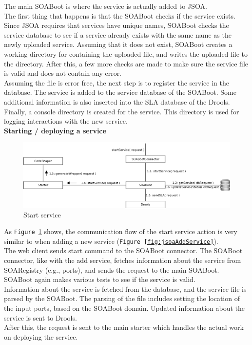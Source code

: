 \documentclass[12pt,a4paper]{article}
\begin{document}
The main SOABoot is where the service is actually added to JSOA. \\
The first thing that happens is that the SOABoot checks if the service exists. Since JSOA requires that services have unique names, SOABoot checks the service database to see if a service already exists with the same name as the newly uploaded service. Assuming that it does not exist, SOABoot creates a working directory for containing the uploaded file, and writes the uploaded file to the directory. After this, a few more checks are made to make sure the service file is valid and does not contain any error. \\
Assuming the file is error free, the next step is to register the service in the database. The service is added to the service database of the SOABoot. Some additional information is also inserted into the SLA database of the Drools. \\
Finally, a console directory is created for the service. This directory is used for logging interactions with the new service. \\

\newpage
\textbf{Starting / deploying a service}
\begin{figure}[h!]
  \centering
    \includegraphics[width=1.0\textwidth]{../figures/jsoa_start_service_communication_diagram.png}
  \caption{Start service}
  \label{fig:jsoaStartService}
\end{figure}

As \texttt{Figure \ref{fig:jsoaStartService}} shows, the communication flow of the start service action is very similar to when adding a new service (\texttt{Figure \ref{fig:jsoaAddService}}). \\
The web client sends start command to the SOABoot connector. The SOABoot connector, like with the add service, fetches information about the service from SOARegistry (e.g., ports), and sends the request to the main SOABoot. \\

SOABoot again makes various tests to see if the service is valid.  \\
Information about the service is fetched from the database, and the service file is parsed by the SOABoot. The parsing of the file includes setting the location of the input ports, based on the SOABoot domain. Updated information about the service is sent to Drools. \\
After this, the request is sent to the main starter which handles the actual work on deploying the service. \\
\end{document}
